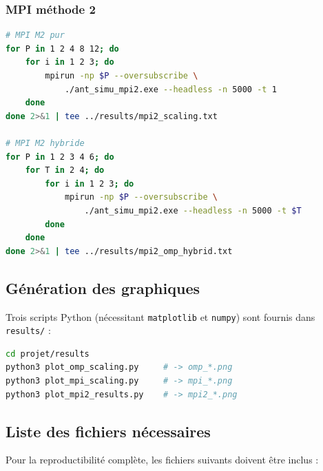 \documentclass[11pt,a4paper]{article}
\begin{document}
\subsubsection{MPI méthode 2}

\begin{lstlisting}[language=bash, caption={Passage à l'échelle MPI méthode 2}]
# MPI M2 pur
for P in 1 2 4 8 12; do
    for i in 1 2 3; do
        mpirun -np $P --oversubscribe \
            ./ant_simu_mpi2.exe --headless -n 5000 -t 1
    done
done 2>&1 | tee ../results/mpi2_scaling.txt

# MPI M2 hybride
for P in 1 2 3 4 6; do
    for T in 2 4; do
        for i in 1 2 3; do
            mpirun -np $P --oversubscribe \
                ./ant_simu_mpi2.exe --headless -n 5000 -t $T
        done
    done
done 2>&1 | tee ../results/mpi2_omp_hybrid.txt
\end{lstlisting}

\subsection{Génération des graphiques}

Trois scripts Python (nécessitant \texttt{matplotlib} et \texttt{numpy}) sont fournis dans \texttt{results/} :

\begin{lstlisting}[language=bash, caption={Génération des figures}]
cd projet/results
python3 plot_omp_scaling.py     # -> omp_*.png
python3 plot_mpi_scaling.py     # -> mpi_*.png
python3 plot_mpi2_results.py    # -> mpi2_*.png
\end{lstlisting}

\subsection{Liste des fichiers nécessaires}

Pour la reproductibilité complète, les fichiers suivants doivent être inclus :
\end{document}
